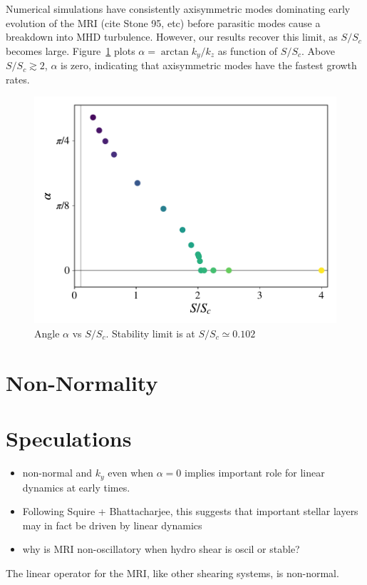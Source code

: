 \documentclass[aps,prl,reprint,groupedaddress]{revtex4-1}
\newcommand{\SSC}{S/S_{c}}
\begin{document}
Numerical simulations have consistently axisymmetric modes dominating early evolution of the MRI (cite Stone 95, etc) before parasitic modes cause a breakdown into MHD turbulence. However, our results recover this limit, as $\SSC$ becomes large. Figure~\ref{fig:alpha} plots $\alpha = \arctan k_y/k_z$ as  function of $\SSC$. Above $\SSC \gtrsim 2$, $\alpha$ is zero, indicating that axisymmetric modes have the fastest growth rates.

\begin{figure}[h]
  \includegraphics[width=\columnwidth]{alpha_vs_ssc_grid.pdf}
  \caption{Angle $\alpha$ vs $\SSC$. Stability limit is at $\SSC \simeq 0.102$}
  \label{fig:alpha}
\end{figure}
\section{Non-Normality}
\label{sec:non-normality}

\section{Speculations}
\label{sec:speculations}

\begin{itemize}
\item non-normal and $k_y$ even when $\alpha = 0$ implies important role for linear dynamics at early times. 
\item Following Squire + Bhattacharjee, this suggests that important stellar layers may in fact be driven by linear dynamics
\item why is MRI non-oscillatory when hydro shear is oscil or stable?
\end{itemize}
The linear operator for the MRI, like other shearing systems, is non-normal. 
\end{document}
